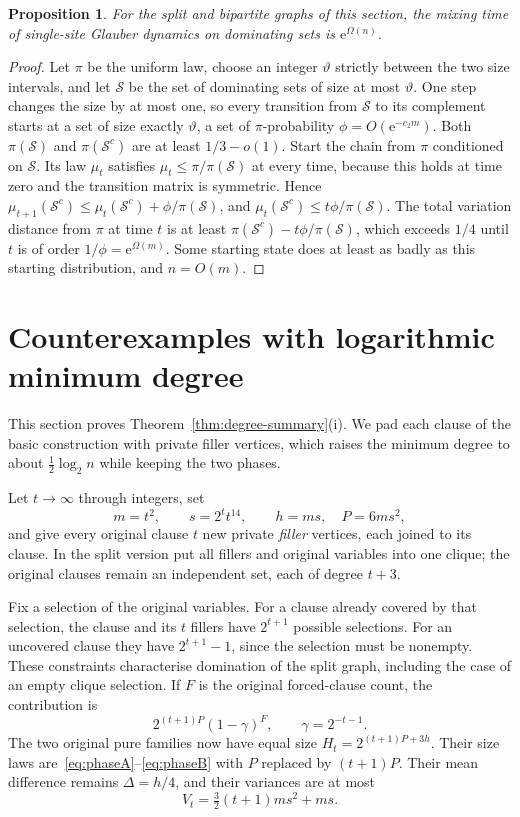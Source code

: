 \documentclass[11pt,a4paper]{article}
\newtheorem{proposition}[theorem]{Proposition}
\theoremstyle{definition}
\theoremstyle{remark}
\begin{document}
\begin{proposition}\label{prop:slow}
For the split and bipartite graphs of this section, the mixing time of single-site Glauber dynamics on dominating sets is $\mathrm e^{\Omega(n)}$.
\end{proposition}
\begin{proof}
Let $\pi$ be the uniform law, choose an integer $\vartheta$ strictly between the two size intervals, and let $\mathcal S$ be the set of dominating sets of size at most $\vartheta$. One step changes the size by at most one, so every transition from $\mathcal S$ to its complement starts at a set of size exactly $\vartheta$, a set of $\pi$-probability $\phi=O(\mathrm e^{-c_2m})$. Both $\pi(\mathcal S)$ and $\pi(\mathcal S^c)$ are at least $1/3-o(1)$. Start the chain from $\pi$ conditioned on $\mathcal S$. Its law $\mu_t$ satisfies $\mu_t\le\pi/\pi(\mathcal S)$ at every time, because this holds at time zero and the transition matrix is symmetric. Hence $\mu_{t+1}(\mathcal S^c)\le\mu_t(\mathcal S^c)+\phi/\pi(\mathcal S)$, and $\mu_t(\mathcal S^c)\le t\phi/\pi(\mathcal S)$. The total variation distance from $\pi$ at time $t$ is at least $\pi(\mathcal S^c)-t\phi/\pi(\mathcal S)$, which exceeds $1/4$ until $t$ is of order $1/\phi=\mathrm e^{\Omega(m)}$. Some starting state does at least as badly as this starting distribution, and $n=O(m)$.
\end{proof}

\section{Counterexamples with logarithmic minimum degree}\label{sec:highdegree}
This section proves Theorem~\ref{thm:degree-summary}(i). We pad each clause of the basic construction with private filler vertices, which raises the minimum degree to about $\tfrac12\log_2 n$ while keeping the two phases.

Let $t\to\infty$ through integers, set
\[
m=t^2,\qquad s=2^t t^{14},\qquad
h=ms,\quad P=6ms^2,
\]
and give every original clause $t$ new private \emph{filler} vertices, each joined to its clause. In the split version put all fillers and original variables into one clique; the original clauses remain an independent set, each of degree $t+3$.

Fix a selection of the original variables. For a clause already covered by that selection, the clause and its $t$ fillers have $2^{t+1}$ possible selections. For an uncovered clause they have $2^{t+1}-1$, since the selection must be nonempty. These constraints characterise domination of the split graph, including the case of an empty clique selection. If $F$ is the original forced-clause count, the contribution is
\[
2^{(t+1)P}(1-\gamma)^F,
\qquad \gamma=2^{-t-1}.
\]
The two original pure families now have equal size
$H_t=2^{(t+1)P+3h}$.
Their size laws are~\eqref{eq:phaseA}--\eqref{eq:phaseB} with $P$ replaced by $(t+1)P$. Their mean difference remains $\Delta=h/4$, and their variances are at most
\begin{equation}\label{eq:hivariance}
V_t=\tfrac32(t+1)ms^2+ms.
\end{equation}
\end{document}
